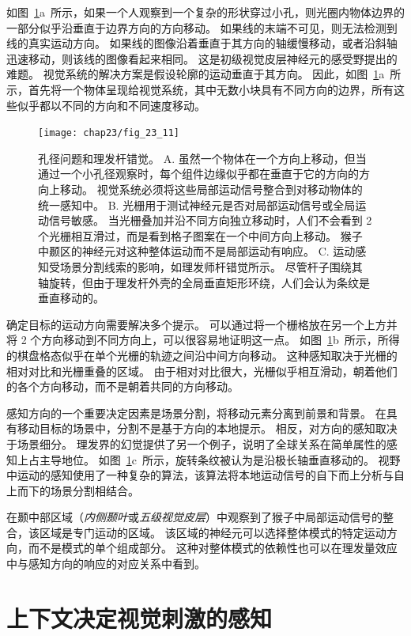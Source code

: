 如图~\ref{fig:23_11}a~所示，如果一个人观察到一个复杂的形状穿过小孔，则光圈内物体边界的一部分似乎沿垂直于边界方向的方向移动。
如果线的末端不可见，则无法检测到线的真实运动方向。 
如果线的图像沿着垂直于其方向的轴缓慢移动，或者沿斜轴迅速移动，则该线的图像看起来相同。
这是初级视觉皮层神经元的感受野提出的难题。 
视觉系统的解决方案是假设轮廓的运动垂直于其方向。 
因此，如图~\ref{fig:23_11}a~所示，首先将一个物体呈现给视觉系统，其中无数小块具有不同方向的边界，所有这些似乎都以不同的方向和不同速度移动。


\begin{figure}[htbp]
	\centering
	\texttt{[image: chap23/fig\_23\_11]}
	\caption{孔径问题和理发杆错觉。
		A. 虽然一个物体在一个方向上移动，但当通过一个小孔径观察时，每个组件边缘似乎都在垂直于它的方向的方向上移动。
		视觉系统必须将这些局部运动信号整合到对移动物体的统一感知中。
		B. 光栅用于测试神经元是否对局部运动信号或全局运动信号敏感。
		当光栅叠加并沿不同方向独立移动时，人们不会看到 2 个光栅相互滑过，而是看到格子图案在一个中间方向上移动。
		猴子中颞区的神经元对这种整体运动而不是局部运动有响应。
		C. 运动感知受场景分割线索的影响，如理发师杆错觉所示。
		尽管杆子围绕其轴旋转，但由于理发杆外壳的全局垂直矩形环绕，人们会认为条纹是垂直移动的。}
	\label{fig:23_11}
\end{figure}


确定目标的运动方向需要解决多个提示。
可以通过将一个栅格放在另一个上方并将 2 个方向移动到不同方向上，可以很容易地证明这一点。
如图~\ref{fig:23_11}b~所示，所得的棋盘格态似乎在单个光栅的轨迹之间沿中间方向移动。
这种感知取决于光栅的相对对比和光栅重叠的区域。
由于相对对比很大，光栅似乎相互滑动，朝着他们的各个方向移动，而不是朝着共同的方向移动。


感知方向的一个重要决定因素是场景分割，将移动元素分离到前景和背景。
在具有移动目标的场景中，分割不是基于方向的本地提示。
相反，对方向的感知取决于场景细分。
理发界的幻觉提供了另一个例子，说明了全球关系在简单属性的感知上占主导地位。
如图~\ref{fig:23_11}c~所示，旋转条纹被认为是沿极长轴垂直移动的。
视野中运动的感知使用了一种复杂的算法，该算法将本地运动信号的自下而上分析与自上而下的场景分割相结合。


在颞中部区域（\textit{内侧颞叶}或\textit{五级视觉皮层}）中观察到了猴子中局部运动信号的整合，该区域是专门运动的区域。
该区域的神经元可以选择整体模式的特定运动方向，而不是模式的单个组成部分。
这种对整体模式的依赖性也可以在理发量效应中与感知方向的响应的对应关系中看到。



\section{上下文决定视觉刺激的感知}


